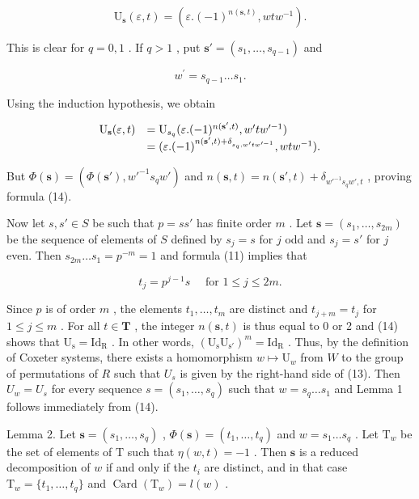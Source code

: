 \[
\mathrm{U} _ {\mathbf {s}} (\varepsilon , t) = (\varepsilon . (- 1) ^ {n (\mathbf {s}, t)}, w t w ^ {- 1}).\tag{14}
\]

This is clear for \(q = 0,1\) . If \(q > 1\) , put \(\mathbf{s}' = (s_1,\dots ,s_{q - 1})\) and

\[
w ^ {\prime} = s _ {q - 1} \dots s _ {1}.
\]

Using the induction hypothesis, we obtain

\[
\begin{array}{r l} \mathrm{U} _ {\mathbf {s}} (\varepsilon , t) & = \mathrm{U} _ {s _ {q}} (\varepsilon . (- 1) ^ {n (\mathbf {s} ^ {\prime}, t)}, w ^ {\prime} t w ^ {\prime - 1}) \\ & = (\varepsilon . (- 1) ^ {n (\mathbf {s} ^ {\prime}, t) + \delta_ {s _ {q}, w ^ {\prime} t w ^ {\prime - 1}}}, w t w ^ {- 1}). \end{array}
\]

But \(\Phi(\mathbf{s}) = (\Phi(\mathbf{s}'), w'^{-1}s_q w')\) and \(n(\mathbf{s}, t) = n(\mathbf{s}', t) + \delta_{w'^{-1}s_q w', t}\) , proving formula (14).

Now let \(s, s' \in S\) be such that \(p = ss'\) has finite order \(m\) . Let \(\mathbf{s} = (s_1, \ldots, s_{2m})\) be the sequence of elements of \(S\) defined by \(s_j = s\) for \(j\) odd and \(s_j = s'\) for \(j\) even. Then \(s_{2m} \ldots s_1 = p^{-m} = 1\) and formula (11) implies that

\[
t _ {j} = p ^ {j - 1} s \quad \text { for } 1 \leqslant j \leqslant 2 m.\tag{15}
\]

Since \(p\) is of order \(m\) , the elements \(t_1, \ldots, t_m\) are distinct and \(t_{j+m} = t_j\) for \(1 \leqslant j \leqslant m\) . For all \(t \in \mathbf{T}\) , the integer \(n(\mathbf{s}, t)\) is thus equal to 0 or 2 and (14) shows that \(\mathrm{U_s} = \mathrm{Id_R}\) . In other words, \((\mathrm{U_sU_{s'}})^m = \mathrm{Id_R}\) . Thus, by the definition of Coxeter systems, there exists a homomorphism \(w \mapsto \mathrm{U}_w\) from \(W\) to the group of permutations of \(R\) such that \(U_s\) is given by the right-hand side of (13). Then \(U_w = U_s\) for every sequence \(s = (s_1, \ldots, s_q)\) such that \(w = s_q \ldots s_1\) and Lemma 1 follows immediately from (14).

Lemma 2. Let \(\mathbf{s} = (s_1, \ldots, s_q)\) , \(\Phi(\mathbf{s}) = (t_1, \ldots, t_q)\) and \(w = s_1 \ldots s_q\) . Let \(\mathrm{T}_w\) be the set of elements of \(\mathrm{T}\) such that \(\eta(w, t) = -1\) . Then \(\mathbf{s}\) is a reduced decomposition of \(w\) if and only if the \(t_i\) are distinct, and in that case \(\mathrm{T}_w = \{t_1, \ldots, t_q\}\) and \(\operatorname{Card}(\mathrm{T}_w) = l(w)\) .

